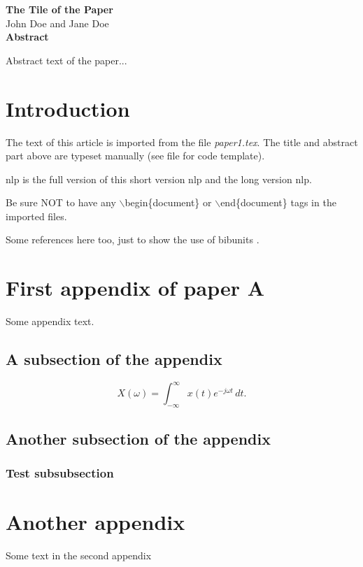 \begin{bibunit}
\thispagestyle{plain}
\begin{center}
\Large\textbf{The Tile of the Paper}\\
\vspace{10mm}
\normalsize John Doe and Jane Doe\\
\vspace{15mm}
\textbf{Abstract}\\
\end{center}
Abstract text of the paper...

\section{Introduction}
The text of this article is imported from the file
\textit{paper1.tex}. The title and abstract part above are typeset
manually (see file for code template).
\cite{Goossens}

\acrfull{nlp} is the full version of this short version \acrshort{nlp} and the long version \acrlong{nlp}. 

Be sure NOT to have any $\backslash$begin\{document\} or
$\backslash$end\{document\} tags in the imported files.

Some references here too, just to show the use of bibunits
\nocite{*}.

\paperappendix
\section{First appendix of paper A}
Some appendix text.
\subsection{A subsection of the appendix}
%
\begin{equation}
    X(\omega) = \int_{-\infty}^{\infty} x(t)e^{-j\omega t}\,dt.
\end{equation}
%
\subsection{Another subsection of the appendix}
\subsubsection{Test subsubsection}

\section{Another appendix}
Some text in the second appendix

\putbib
\end{bibunit}
